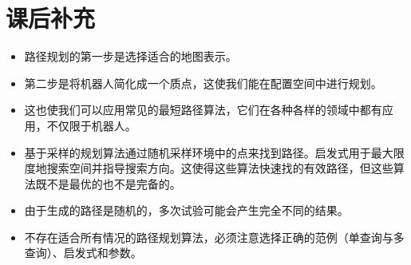 \section*{课后补充}
\begin{itemize}

\item 路径规划的第一步是选择适合的地图表示。
\item 第二步是将机器人简化成一个质点，这使我们能在配置空间中进行规划。
\item 这也使我们可以应用常见的最短路径算法，它们在各种各样的领域中都有应用，不仅限于机器人。
\item 基于采样的规划算法通过随机采样环境中的点来找到路径。启发式用于最大限度地搜索空间并指导搜索方向。这使得这些算法快速找的有效路径，但这些算法既不是最优的也不是完备的。
\item 由于生成的路径是随机的，多次试验可能会产生完全不同的结果。
\item 不存在适合所有情况的路径规划算法，必须注意选择正确的范例（单查询与多查询）、启发式和参数。
\end{itemize}

